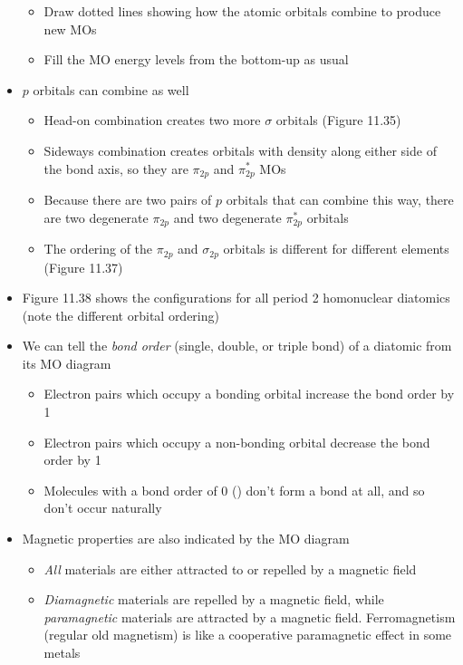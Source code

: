\documentclass[12pt, openany, letterpaper]{memoir}
\begin{document}
\begin{itemize}
\begin{itemize}
		      \item Draw dotted lines showing how the atomic orbitals combine to produce new MOs
		      \item Fill the MO energy levels from the bottom-up as usual
	      \end{itemize}
	\item $p$ orbitals can combine as well
	      \begin{itemize}
		      \item Head-on combination creates two more $\sigma$ orbitals (Figure 11.35)
		      \item Sideways combination creates orbitals with density along either side of the bond axis, so they are $\pi_{2p}$ and $\pi^*_{2p}$ MOs
		      \item Because there are two pairs of $p$ orbitals that can combine this way, there are two degenerate $\pi_{2p}$ and two degenerate $\pi^*_{2p}$ orbitals
		      \item The ordering of the $\pi_{2p}$ and $\sigma_{2p}$ orbitals is different for different elements (Figure 11.37)
	      \end{itemize}
	\item Figure 11.38 shows the configurations for all period 2 homonuclear diatomics (note the different orbital ordering)
	\item We can tell the \emph{bond order} (single, double, or triple bond) of a diatomic from its MO diagram
	      \begin{itemize}
		      \item Electron pairs which occupy a bonding orbital increase the bond order by 1
		      \item Electron pairs which occupy a non-bonding orbital decrease the bond order by 1
		      \item Molecules with a bond order of 0 () don't form a bond at all, and so don't occur naturally
	      \end{itemize}
	\item Magnetic properties are also indicated by the MO diagram
	      \begin{itemize}
		      \item \emph{All} materials are either attracted to or repelled by a magnetic field
		      \item \emph{Diamagnetic} materials are repelled by a magnetic field, while \emph{paramagnetic} materials are attracted by a magnetic field. Ferromagnetism (regular old magnetism) is like a cooperative paramagnetic effect in some metals

\end{itemize}
\end{itemize}
\end{document}
